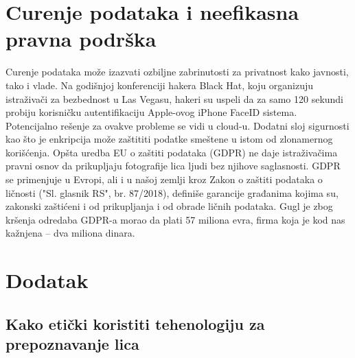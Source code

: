 \documentclass{article}
\begin{document}
\newpage

\section{Curenje podataka i neefikasna pravna podrška}

Curenje podataka može izazvati ozbiljne zabrinutosti za privatnost kako javnosti, tako i vlade.
\newline
\newline
Na godišnjoj konferenciji hakera Black Hat, koju organizuju istraživači za bezbednost u Las Vegasu, hakeri su uspeli da za samo 120 sekundi probiju korisničku autentifikaciju Apple-ovog iPhone FaceID sistema. Potencijalno rešenje za ovakve probleme se vidi u cloud-u. Dodatni sloj sigurnosti kao što je enkripcija može zaštititi podatke smeštene u istom od zlonamernog korišćenja.
\newline
\newline
Opšta uredba EU o zaštiti podataka (GDPR) ne daje istraživačima pravni osnov da prikupljaju fotografije lica ljudi bez njihove saglasnosti. GDPR se primenjuje u Evropi, ali i u našoj zemlji kroz Zakon o zaštiti podataka o ličnosti ("Sl. glasnik RS", br. 87/2018), definiše garancije građanima kojima su, zakonski zaštićeni i od prikupljanja i od obrade ličnih podataka. Gugl je zbog kršenja odredaba GDPR-a morao da plati 57 miliona evra, firma koja je kod nas kažnjena – dva miliona dinara.

\newpage

\section{Dodatak }

\subsection{Kako etički koristiti tehenologiju za prepoznavanje lica}
\end{document}

